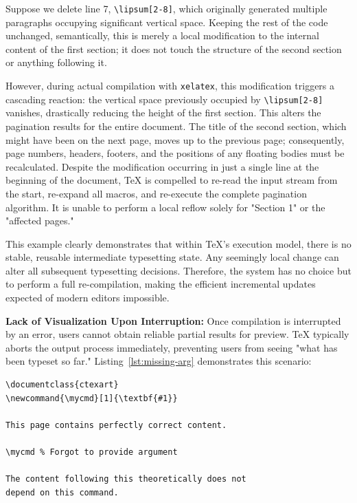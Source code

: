 Suppose we delete line 7, \texttt{\textbackslash lipsum[2-8]}, which originally generated multiple paragraphs occupying significant vertical space. Keeping the rest of the code unchanged, semantically, this is merely a local modification to the internal content of the first section; it does not touch the structure of the second section or anything following it.

However, during actual compilation with \texttt{xelatex}, this modification triggers a cascading reaction: the vertical space previously occupied by \texttt{\textbackslash lipsum[2-8]} vanishes, drastically reducing the height of the first section. This alters the pagination results for the entire document. The title of the second section, which might have been on the next page, moves up to the previous page; consequently, page numbers, headers, footers, and the positions of any floating bodies must be recalculated. Despite the modification occurring in just a single line at the beginning of the document, \TeX{} is compelled to re-read the input stream from the start, re-expand all macros, and re-execute the complete pagination algorithm. It is unable to perform a local reflow solely for "Section 1" or the "affected pages."

This example clearly demonstrates that within \TeX{}'s execution model, there is no stable, reusable intermediate typesetting state. Any seemingly local change can alter all subsequent typesetting decisions. Therefore, the system has no choice but to perform a full re-compilation, making the efficient incremental updates expected of modern editors impossible.

\textbf{Lack of Visualization Upon Interruption:} Once compilation is interrupted by an error, users cannot obtain reliable partial results for preview. \TeX{} typically aborts the output process immediately, preventing users from seeing "what has been typeset so far." Listing~\ref{lst:missing-arg} demonstrates this scenario:

\begin{lstlisting}[caption={Missing argument error},label={lst:missing-arg}]
\documentclass{ctexart}
\newcommand{\mycmd}[1]{\textbf{#1}}

This page contains perfectly correct content.

\mycmd % Forgot to provide argument

The content following this theoretically does not
depend on this command.

\end{lstlisting}

